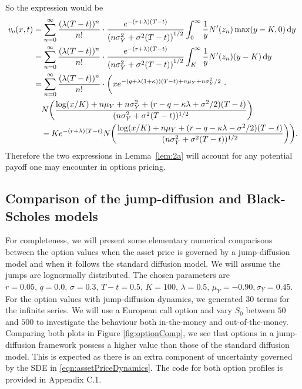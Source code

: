 {$$	$$
So the expression would be
	\begin{align*}
		v_\text{e}(x,t) &=  \displaystyle\sum\limits_{n=0}^\infty\frac{(\lambda(T-t))^n}{n!}\cdot\frac{e^{-(r+\lambda)(T-t)}}{\left(n\sigma_Y^2 + \sigma^2(T-t)\right)^{1/2}}\int_0^\infty \frac{1}{y}N'(z_n) \max(y-K,0) \, \mathrm d y \\
		&= \displaystyle\sum\limits_{n=0}^\infty\frac{(\lambda(T-t))^n}{n!}\cdot\frac{e^{-(r+\lambda)(T-t)}}{\left(n\sigma_Y^2 + \sigma^2(T-t)\right)^{1/2}}\int_K^\infty \frac{1}{y}N'(z_n) (y-K) \, \mathrm d y \\
		&=  \displaystyle\sum\limits_{n=0}^\infty\frac{(\lambda(T-t))^n}{n!}\cdot\bigg( xe^{-(q+\lambda(1+\kappa))(T-t) + n\mu_Y + n\sigma_Y^2/2} \ \cdot \ \\
		&{} \quad  N\bigg( \frac{\log(x/K) + n\mu_Y + n\sigma_Y^2 + (r-q-\kappa\lambda + \sigma^2/2)(T-t)}{(n\sigma_Y^2 + \sigma^2(T-t))^{1/2}} \bigg) \\
		&{} \quad - Ke^{-(r+\lambda)(T-t)}N\bigg( \frac{\log(x/K) + n\mu_Y + (r-q-\kappa\lambda - \sigma^2/2)(T-t) }{(n\sigma_Y^2 + \sigma^2(T-t))^{1/2}} \bigg)\bigg).
			\end{align*}
Therefore the two expressions in Lemma~\ref{lem:2a} will account for any potential payoff one may encounter in options pricing.
}

\subsection{Comparison of the jump-diffusion and Black-Scholes models}
For completeness, we will present some elementary numerical comparisons between the option values when the asset price is governed by a jump-diffusion model and when it follows the standard diffusion model. We will assume the jumps are lognormally distributed. The chosen parameters are $r = 0.05, \, q = 0.0, \, \sigma = 0.3, \, T-t = 0.5, \, K = 100, \, \lambda = 0.5, \, \mu_Y = -0.90, \sigma_Y = 0.45$. For the option values with jump-diffusion dynamics, we generated 30 terms for the infinite series. We will use a European call option and vary $S_0$ between $50$ and $500$ to investigate the behaviour both in-the-money and out-of-the-money. Comparing both plots in Figure \ref{fig:optionComp}, we see that options in a jump-diffusion framework possess a higher value than those of the standard diffusion model. This is expected as there is an extra component of uncertainty governed by the SDE in \eqref{eqn:assetPriceDynamics}. The code for both option profiles is provided in Appendix C.1.

